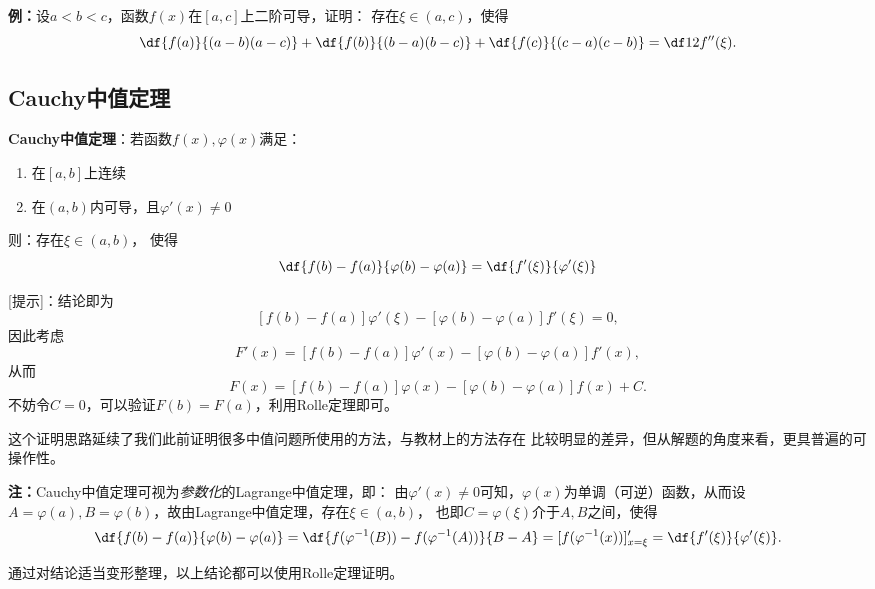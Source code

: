 {\bf 例：}设$a<b<c$，函数$f(x)$在$[a,c]$上二阶可导，证明：
存在$\xi\in(a,c)$，使得
$$
\df{f(a)}{(a-b)(a-c)}+\df{f(b)}{(b-a)(b-c)}
+\df{f(c)}{(c-a)(c-b)}=\df12f''(\xi).
$$

% 

\subsection{Cauchy中值定理}

\begin{thx}
	{\bf Cauchy中值定理}：若函数$f(x),\varphi(x)$满足： 
	\begin{enumerate}[(1)]
	  \setlength{\itemindent}{1cm}
	  \item 在$[a,b]$上连续 
	  \item 在$(a,b)$内可导，且$\varphi'(x)\ne 0$ 
	\end{enumerate}
	则：存在$\xi\in(a,b)$， 使得
	$$\df{f(b)-f(a)}{\varphi(b)-\varphi(a)}=\df{f'(\xi)}{\varphi'(\xi)}$$
\end{thx}

[提示]：结论即为
$$[f(b)-f(a)]\varphi'(\xi)-[\varphi(b)-\varphi(a)]f'(\xi)=0,$$
因此考虑
$$F'(x)=[f(b)-f(a)]\varphi'(x)-[\varphi(b)-\varphi(a)]f'(x),$$
从而
$$F(x)=[f(b)-f(a)]\varphi(x)-[\varphi(b)-\varphi(a)]f(x)+C.$$
不妨令$C=0$，可以验证$F(b)=F(a)$，利用Rolle定理即可。

这个证明思路延续了我们此前证明很多中值问题所使用的方法，与教材上的方法存在
比较明显的差异，但从解题的角度来看，更具普遍的可操作性。

{\bf 注：}Cauchy中值定理可视为{\it 参数化}的Lagrange中值定理，即：
由$\varphi'(x)\ne 0$可知，$\varphi(x)$为单调（可逆）函数，从而设
$A=\varphi(a),B=\varphi(b)$，故由Lagrange中值定理，存在$\xi\in(a,b)$，
也即$C=\varphi(\xi)$介于$A,B$之间，使得
$$\df{f(b)-f(a)}{\varphi(b)-\varphi(a)}
=\df{f(\varphi^{-1}(B))-f(\varphi^{-1}(A))}{B-A}
=[f(\varphi^{-1}(x))]'_{x=\xi}=\df{f'(\xi)}{\varphi'(\xi)}.$$

通过对结论适当变形整理，以上结论都可以使用Rolle定理证明。


